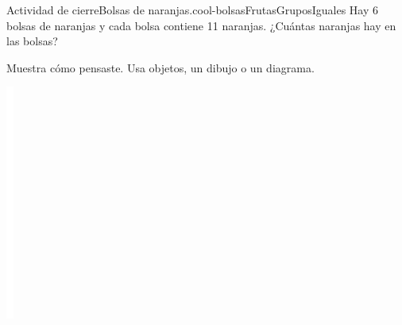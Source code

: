 \documentclass[14pt]{extarticle}
\begin{document}
\begin{project}{Actividad de cierre}{Bolsas de naranjas.}{cool-bolsasFrutasGruposIguales}%
Hay 6 bolsas de naranjas y cada bolsa contiene 11 naranjas. ¿Cuántas naranjas hay en las bolsas?%
\par
Muestra cómo pensaste. Usa objetos, un dibujo o un diagrama.%
\begin{image}{0}{1}{0}{}%
\includegraphics[max width=\linewidth, center]{external/whitespace-tikz/5cm.pdf}
\end{image}%
\end{project}
\end{document}
